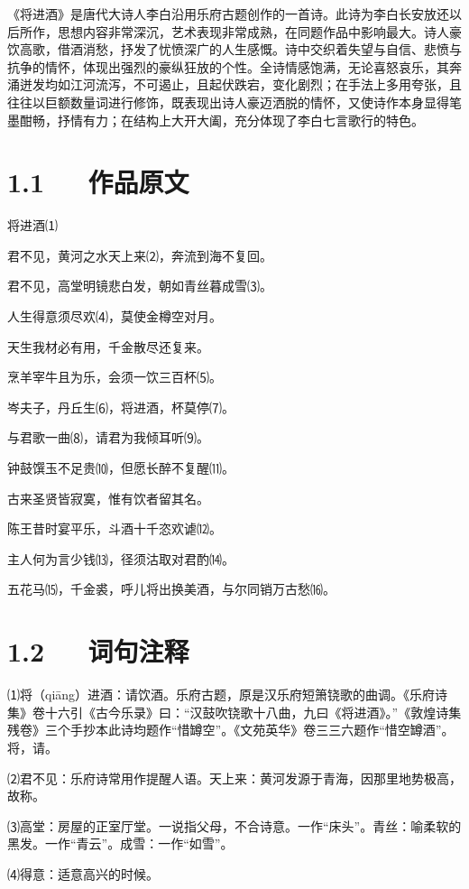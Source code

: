 \documentclass[letterpaper,12pt,english]{sphinxmanual}
\begin{document}
《将进酒》是唐代大诗人李白沿用乐府古题创作的一首诗。此诗为李白长安放还以后所作，思想内容非常深沉，艺术表现非常成熟，在同题作品中影响最大。诗人豪饮高歌，借酒消愁，抒发了忧愤深广的人生感慨。诗中交织着失望与自信、悲愤与抗争的情怀，体现出强烈的豪纵狂放的个性。全诗情感饱满，无论喜怒哀乐，其奔涌迸发均如江河流泻，不可遏止，且起伏跌宕，变化剧烈；在手法上多用夸张，且往往以巨额数量词进行修饰，既表现出诗人豪迈洒脱的情怀，又使诗作本身显得笔墨酣畅，抒情有力；在结构上大开大阖，充分体现了李白七言歌行的特色。


\section{1.1   作品原文}
\label{\detokenize{p01_u6563_u6587/_u674e_u767d-_u5c06_u8fdb_u9152:id3}}
将进酒⑴

君不见，黄河之水天上来⑵，奔流到海不复回。

君不见，高堂明镜悲白发，朝如青丝暮成雪⑶。

人生得意须尽欢⑷，莫使金樽空对月。

天生我材必有用，千金散尽还复来。

烹羊宰牛且为乐，会须一饮三百杯⑸。

岑夫子，丹丘生⑹，将进酒，杯莫停⑺。

与君歌一曲⑻，请君为我倾耳听⑼。

钟鼓馔玉不足贵⑽，但愿长醉不复醒⑾。

古来圣贤皆寂寞，惟有饮者留其名。

陈王昔时宴平乐，斗酒十千恣欢谑⑿。

主人何为言少钱⒀，径须沽取对君酌⒁。

五花马⒂，千金裘，呼儿将出换美酒，与尔同销万古愁⒃。


\section{1.2   词句注释}
\label{\detokenize{p01_u6563_u6587/_u674e_u767d-_u5c06_u8fdb_u9152:id4}}
⑴将（qiāng）进酒：请饮酒。乐府古题，原是汉乐府短箫铙歌的曲调。《乐府诗集》卷十六引《古今乐录》曰：“汉鼓吹铙歌十八曲，九曰《将进酒》。”《敦煌诗集残卷》三个手抄本此诗均题作“惜罇空”。《文苑英华》卷三三六题作“惜空罇酒”。将，请。

⑵君不见：乐府诗常用作提醒人语。天上来：黄河发源于青海，因那里地势极高，故称。

⑶高堂：房屋的正室厅堂。一说指父母，不合诗意。一作“床头”。青丝：喻柔软的黑发。一作“青云”。成雪：一作“如雪”。

⑷得意：适意高兴的时候。
\end{document}
